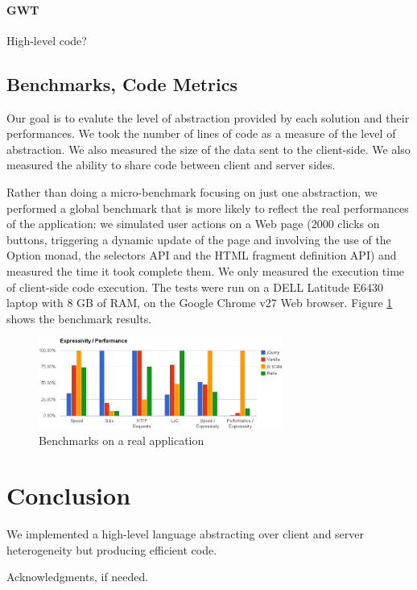 \documentclass[preprint]{sigplanconf}
\begin{document}
\paragraph*{GWT} High-level code?

\subsection{Benchmarks, Code Metrics}

Our goal is to evalute the level of abstraction provided by each solution and their performances. We took the
number of lines of code as a measure of the level of abstraction. We also measured the size of the data sent to the
client-side. We also measured the ability to share code between client and server sides.

Rather than doing a micro-benchmark focusing on just one abstraction, we performed a global benchmark that is more
likely to reflect the real performances of the application: we simulated user actions on a Web page (2000 clicks on
buttons, triggering a dynamic update of the page and involving the use of the Option monad, the selectors API and
the HTML fragment definition API) and measured the time it took complete them. We only measured the execution time of
client-side code execution. The tests were run on a DELL Latitude E6430 laptop with 8 GB of RAM, on the Google
Chrome v27 Web browser. Figure \ref{benchmark} shows the benchmark results.

\begin{figure}
\centering
\includegraphics[width=8cm]{chooze.png}
\caption{Benchmarks on a real application}
\label{benchmark}
\end{figure}


\section{Conclusion}
\label{discussion}

We implemented a high-level language abstracting over client and server heterogeneity but producing efficient code.

%
%
\acks

Acknowledgments, if needed.



%
%
%
\end{document}

